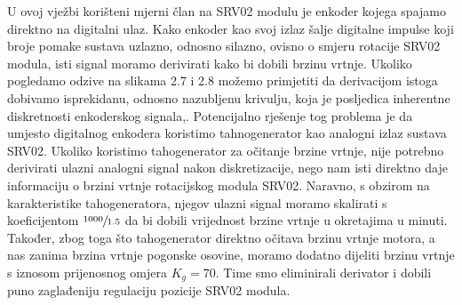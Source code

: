 \documentclass[12pt,a4paper]{article}
\begin{document}
U ovoj vježbi korišteni mjerni član na SRV02 modulu je enkoder kojega spajamo direktno na digitalni ulaz. Kako enkoder kao svoj izlaz šalje digitalne impulse koji broje pomake sustava uzlazno, odnosno silazno, ovisno o smjeru rotacije SRV02 modula, isti signal moramo derivirati kako bi dobili brzinu vrtnje. Ukoliko pogledamo odzive na slikama 2.7 i 2.8 možemo primjetiti da derivacijom istoga dobivamo isprekidanu, odnosno nazubljenu krivulju, koja je posljedica inherentne diskretnosti enkoderskog signala,. Potencijalno rješenje tog problema je da umjesto digitalnog enkodera koristimo tahnogenerator kao analogni izlaz sustava SRV02. Ukoliko koristimo tahogenerator za očitanje brzine vrtnje, nije potrebno derivirati ulazni analogni signal nakon diskretizacije, nego nam isti direktno daje informaciju o brzini vrtnje rotacijskog modula SRV02. Naravno, s obzirom na karakteristike tahogeneratora, njegov ulazni signal moramo skalirati s koeficijentom $\sfrac{1000}{1.5}$ da bi dobili vrijednost brzine vrtnje u okretajima u minuti.
Također, zbog toga što tahogenerator direktno očitava brzinu vrtnje motora, a nas zanima brzina vrtnje pogonske osovine, moramo dodatno dijeliti brzinu vrtnje s iznosom prijenosnog omjera $K_g = 70$. Time smo eliminirali derivator i dobili puno zaglađeniju regulaciju pozicije SRV02 modula.
\end{document}
